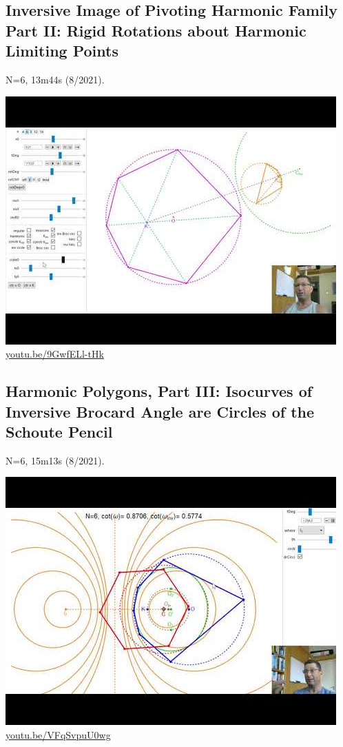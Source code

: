 \documentclass[12pt]{amsart}
\begin{document}
\subsection{Inversive Image of Pivoting Harmonic Family Part II: Rigid Rotations about Harmonic Limiting Points}
\label{vid:9GwfELl-tHk}
\noindent N=6, 13m44s (8/2021). 
\begin{center}\includegraphics[width=.5\textwidth]{pics/9GwfELl-tHk.jpg} \\ 
\href{https://youtu.be/9GwfELl-tHk}{\url{youtu.be/9GwfELl-tHk}}\end{center}
% 

\subsection{Harmonic Polygons, Part III: Isocurves of Inversive Brocard Angle are Circles of the Schoute Pencil}
\label{vid:VFqSvpuU0wg}
\noindent N=6, 15m13s (8/2021). 
\begin{center}\includegraphics[width=.5\textwidth]{pics/VFqSvpuU0wg.jpg} \\ 
\href{https://youtu.be/VFqSvpuU0wg}{\url{youtu.be/VFqSvpuU0wg}}\end{center}
% 
\end{document}

